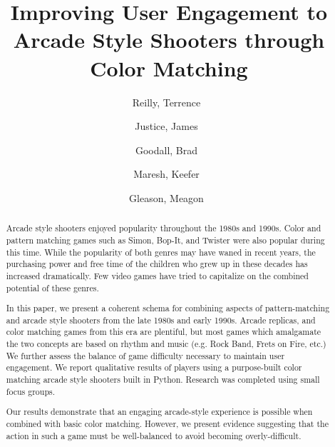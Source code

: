 \documentclass[letterpaper,12pt]{article}
\author{
    Reilly, Terrence\
    \and
    Justice, James\
    \and
    Goodall, Brad\
    \and
    Maresh, Keefer\
    \and
    Gleason, Meagon\
}
\title{Improving User Engagement to Arcade Style Shooters through Color Matching}
\begin{document}
    \maketitle
    \linespread{1.5}
    \nocite{*}
    \begin{abstract}
        Arcade style shooters enjoyed popularity throughout the 1980s and 1990s.
        Color and pattern matching games such as Simon, Bop-It, and Twister were
        also popular during this time.  While the popularity of both genres may
        have waned in recent years, the purchasing power and free time of the children
        who grew up in these decades has increased dramatically.  Few video
        games have tried to capitalize on the combined potential of these genres.

        In this paper, we present a coherent schema for combining aspects of
        pattern-matching and arcade style shooters from the late 1980s and
        early 1990s.  Arcade replicas, and color matching games from this era
        are plentiful, but most games which amalgamate the two concepts are based on
        rhythm and music (e.g. Rock Band, Frets on Fire, etc.) We further assess
        the balance of game difficulty necessary to maintain user engagement.  We
        report qualitative results of players using a purpose-built color matching
        arcade style shooters built in Python.  Research was completed using small
        focus groups.

        Our results demonstrate that an engaging arcade-style experience is possible
        when combined with basic color matching. However, we present evidence
        suggesting that the action in such a game must be well-balanced to avoid
        becoming overly-difficult.
    \end{abstract}

    
    
\end{document}
